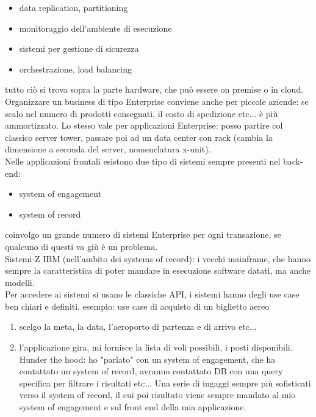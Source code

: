 \documentclass{article}
\begin{document}
\begin{itemize}
\item data replication, partitioning
\item monitoraggio dell'ambiente di esecuzione
\item sistemi per gestione di sicurezza
\item orchestrazione, load balancing
\end{itemize}
tutto ciò si trova sopra la parte hardware, che può essere on premise o in cloud.\\ Organizzare un business di tipo Enterprise conviene anche per piccole aziende: se scalo nel numero di prodotti consegnati, il costo di spedizione etc... è più ammortizzato. Lo stesso vale per applicazioni Enterprise: posso partire col classico server tower, passare poi ad un data center con rack (cambia la dimensione a seconda del server, nomenclatura x-unit).\\ Nelle applicazioni frontali esistono due tipo di sistemi sempre presenti nel back-end:
\begin{itemize}
\item system of engagement
\item system of record
\end{itemize}
coinvolgo un grande numero di sistemi Enterprise per ogni transazione, se qualcuno di questi va giù è un problema.\\ Sistemi-Z IBM (nell'ambito dei systems of record): i vecchi mainframe, che hanno sempre la caratteristica di poter mandare in esecuzione software datati, ma anche modelli.\\ Per accedere ai sistemi si usano le classiche API, i sistemi hanno degli use case ben chiari e definiti. esempio: use case di acquisto di un biglietto aereo
\begin{enumerate}
\item scelgo la meta, la data, l'aeroporto di partenza e di arrivo etc...
\item l'applicazione gira, mi fornisce la lista di voli possibili,  i posti disponibili. Hunder the hood: ho "parlato" con un system of engagement, che ha contattato un system of record, avranno contattato DB con una query specifica per filtrare i risultati etc... Una serie di ingaggi sempre più sofisticati verso il system of record, il cui poi risultato viene sempre mandato al mio system of engagement e sul front end della mia applicazione.
\end{enumerate}
\end{document}

